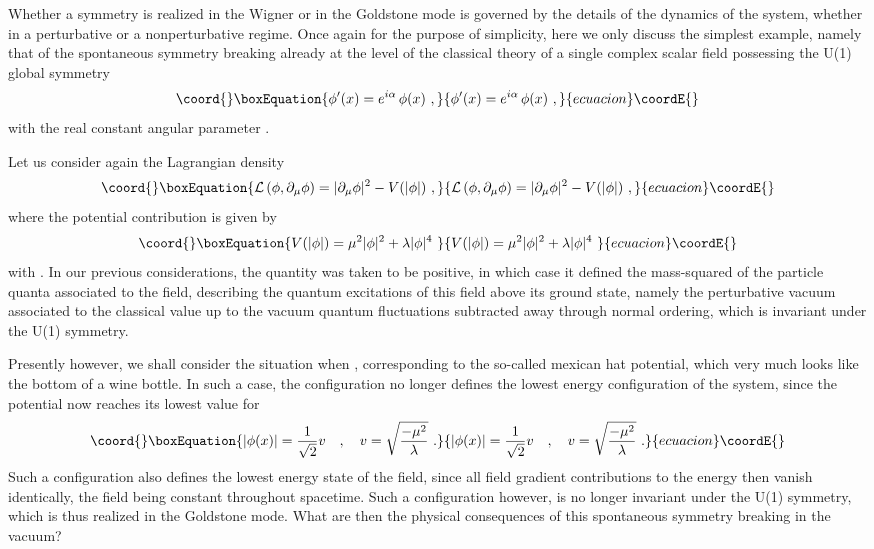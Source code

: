\documentclass[a4paper,11pt]{article}
\begin{document}
Whether a symmetry is realized in the Wigner or in the Goldstone mode
is governed by the details of the dynamics of the system, whether in
a perturbative or a nonperturbative regime. Once again for the purpose of
simplicity, here we only discuss the simplest example, namely that
of the spontaneous symmetry breaking already at the level of the classical
theory of a single complex scalar field \coordHE{} possessing the U(1) 
global symmetry
\begin{equation}\coord{}\boxEquation{
\phi'(x)=e^{i\alpha}\,\phi(x)\ ,
}{
\phi'(x)=e^{i\alpha}\,\phi(x)\ ,
}{ecuacion}\coordE{}\end{equation}
with the real constant angular parameter \myHighlight{$\alpha$}\coordHE{}.

Let us consider again the Lagrangian density
\begin{equation}\coord{}\boxEquation{
{\cal L}\left(\phi,\partial_\mu\phi\right)=
|\partial_\mu\phi|^2-V(|\phi|)\ ,
}{
{\cal L}\left(\phi,\partial_\mu\phi\right)=
|\partial_\mu\phi|^2-V(|\phi|)\ ,
}{ecuacion}\coordE{}\end{equation}
where the potential contribution is given by
\begin{equation}\coord{}\boxEquation{
V(|\phi|)=\mu^2|\phi|^2+\lambda|\phi|^4\ 
}{
V(|\phi|)=\mu^2|\phi|^2+\lambda|\phi|^4\ 
}{ecuacion}\coordE{}\end{equation}
with \myHighlight{$\lambda>0$}\coordHE{}. In our previous considerations, the quantity \coordHE{}
was taken to be positive, in which case it defined the mass-squared of the
particle quanta associated to the field, describing the quantum
excitations of this field above its ground state, namely the perturbative
vacuum \myHighlight{$|0>$}\coordHE{} associated to the classical value \coordHE{} up to the vacuum
quantum fluctuations subtracted away through normal ordering, which is
invariant under the U(1) symmetry. 

Presently however, we shall consider the situation when \coordHE{},
cor\-res\-pon\-ding to the so-called mexican hat potential, which very much 
looks like the bottom of a wine bottle. In such a case, the configuration 
\myHighlight{$\phi=0$}\coordHE{} no longer defines the lowest energy configuration of the system, 
since the potential \myHighlight{$V(|\phi|)$}\coordHE{} now reaches its lowest value for
\begin{equation}\coord{}\boxEquation{
|\phi(x)|=\frac{1}{\sqrt{2}}v\ \ \ ,\ \ \ 
v=\sqrt{\frac{-\mu^2}{\lambda}}\ .
}{
|\phi(x)|=\frac{1}{\sqrt{2}}v\ \ \ ,\ \ \ 
v=\sqrt{\frac{-\mu^2}{\lambda}}\ .
}{ecuacion}\coordE{}\end{equation}
Such a configuration also defines the lowest energy state of the field,
since all field gradient contributions to the energy then vanish
identically, the field being constant throughout spacetime. Such a 
configuration however, is no longer invariant under the U(1) symmetry,
which is thus realized in the Goldstone mode. What are then the physical
consequences of this spontaneous symmetry breaking in the vacuum?
\end{document}
